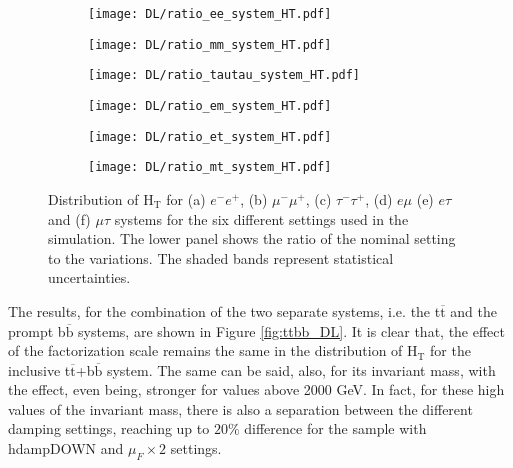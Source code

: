 \begin{figure}[H]
    \centering
    \begin{subfigure}{0.32\textwidth}
        \centering
        \texttt{[image: DL/ratio\_ee\_system\_HT.pdf]}
        \caption{}
        \label{subfig:HT(ee)_DL}
    \end{subfigure}
\hfill
    \begin{subfigure}{0.32\textwidth}
        \centering
        \texttt{[image: DL/ratio\_mm\_system\_HT.pdf]}
        \caption{}
        \label{subfig:HT(mm)_DL}
    \end{subfigure}
\hfill
    \begin{subfigure}{0.32\textwidth}
        \centering
        \texttt{[image: DL/ratio\_tautau\_system\_HT.pdf]}
        \caption{}
        \label{subfig:HT(tt)_DL}
    \end{subfigure}

    \vspace{0.2cm}

    \begin{subfigure}{0.32\textwidth}
        \centering
        \texttt{[image: DL/ratio\_em\_system\_HT.pdf]}
        \caption{}
        \label{subfig:HT(em)_DL}
    \end{subfigure}
\hfill
    \begin{subfigure}{0.32\textwidth}
        \centering
        \texttt{[image: DL/ratio\_et\_system\_HT.pdf]}
        \caption{}
        \label{subfig:HT(et)_DL}
    \end{subfigure}
\hfill
    \begin{subfigure}{0.32\textwidth}
        \centering
        \texttt{[image: DL/ratio\_mt\_system\_HT.pdf]}
        \caption{}
        \label{subfig:HT(mt)_DL}
    \end{subfigure}
    \caption{Distribution of H$_\text{T}$ for (a) $e^-e^+$, (b) $\mu^-\mu^+$, (c) $\tau^-\tau^+$, (d) $e\mu$ (e) $e\tau$ and (f) $\mu\tau$ systems for the six different settings used in the simulation. The lower panel shows the ratio of the nominal setting to the variations. The shaded bands represent statistical uncertainties. }
    \label{fig:HT(ll_all)_DL}
\end{figure}
\indent The results, for the combination of the two separate systems, i.e. the t$\overline{\text{t}}$ and the prompt b$\overline{\text{b}}$ systems, are shown in Figure \ref{fig:ttbb_DL}. It is clear that, the effect of the  factorization scale remains the same in the distribution of H$_\text{T}$ for the inclusive t$\overline{\text{t}}$+b$\overline{\text{b}}$ system. The same can be said, also, for its invariant mass, with the effect, even being, stronger for values above 2000 GeV. In fact, for these high values of the invariant mass, there is also a separation between the different damping settings, reaching up to $20 \%$ difference for the sample with hdampDOWN and $\mu_F \times 2$ settings.\\

